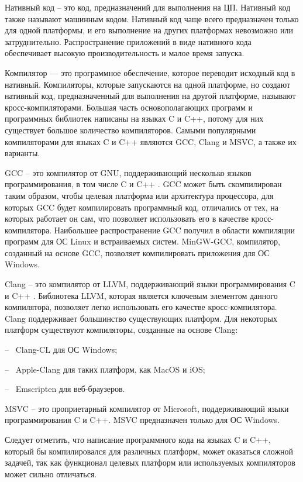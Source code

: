 Нативный код -- это код, предназначений для выполнения на ЦП.
Нативный код также называют машинным кодом.
Нативный код чаще всего предназначен только для одной платформы, и его выполнение на других платформах невозможно или затруднительно.
Распространение приложений в виде нативного кода обеспечивает высокую производительность и малое время запуска.

Компилятор — это программное обеспечение, которое переводит исходный код в нативный.
Компиляторы, которые запускаются на одной платформе, но создают нативный код, предназначенный для выполнения на другой платформе, называют кросс-компиляторами.
Большая часть основополагающих программ и программных библиотек написаны на языках C и C++, потому для них существует большое количество компиляторов.
Самыми популярными компиляторами для языках C и C++ являются GCC, Clang и MSVC, а также их варианты.

GCC -- это компилятор от GNU, поддерживающий несколько языков программирования, в том числе C и C++ \cite{GCCLangs}. 
GCC может быть скомпилирован таким образом, чтобы целевая платформа или архитектура процессора, для которых GCC будет компилировать программный код, отличались от тех, на которых работает он сам, что позволяет использовать его в качестве кросс-компилятора.
Наибольшее распространение GCC получил в области компиляции программ для ОС Linux и встраиваемых систем.
MinGW-GCC, компилятор, созданный на основе GCC, позволяет компилировать приложения для ОС Windows.

Clang -- это компилятор от LLVM, поддерживающий языки программирования C и C++ \cite{CLangLangs}.
Библиотека LLVM, которая является ключевым элементом данного компилятора, позволяет легко использовать его качестве кросс-компилятора. 
Clang поддерживает большинство существующих платформ. 
Для некоторых платформ существуют компиляторы, созданные на основе Clang:

-- ~Clang-CL для ОС Windows;

-- ~Apple-Clang для таких платформ, как MacOS и iOS;

-- ~Emscripten для веб-браузеров.

MSVC -- это проприетарный компилятор от Microsoft, поддерживающий языки программирования C и C++. 
MSVC предназначен только для ОС Windows. 

Следует отметить, что написание программного кода на языках C и C++, который бы компилировался для различных платформ, может оказаться сложной задачей, так как функционал целевых платформ или используемых компиляторов может сильно отличаться.



